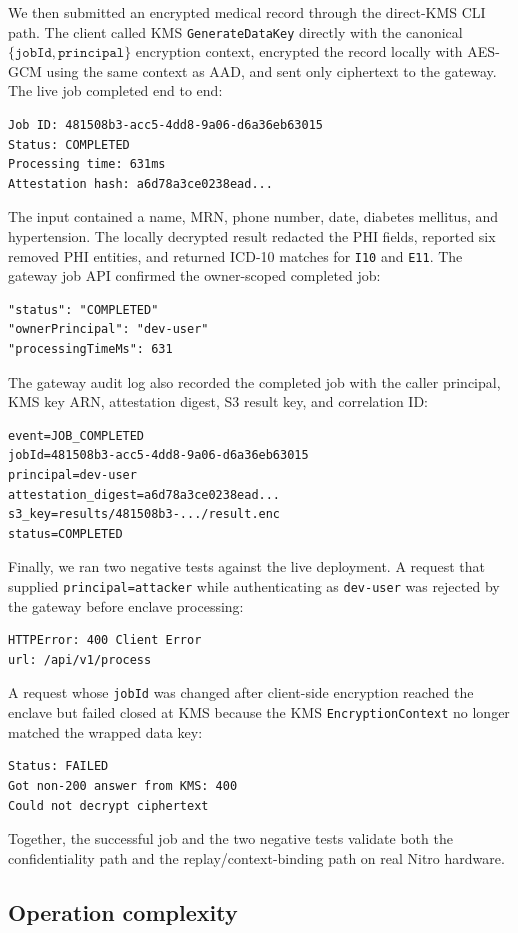 \documentclass[11pt]{article}
\begin{document}
We then submitted an encrypted medical record through the direct-KMS
CLI path. The client called KMS \texttt{GenerateDataKey} directly with
the canonical $\{\texttt{jobId},\texttt{principal}\}$ encryption
context, encrypted the record locally with AES-GCM using the same
context as AAD, and sent only ciphertext to the gateway. The live job
completed end to end:
\begin{verbatim}
Job ID: 481508b3-acc5-4dd8-9a06-d6a36eb63015
Status: COMPLETED
Processing time: 631ms
Attestation hash: a6d78a3ce0238ead...
\end{verbatim}
The input contained a name, MRN, phone number, date, diabetes mellitus,
and hypertension. The locally decrypted result redacted the PHI fields,
reported six removed PHI entities, and returned ICD-10 matches for
\texttt{I10} and \texttt{E11}. The gateway job API confirmed the
owner-scoped completed job:
\begin{verbatim}
"status": "COMPLETED"
"ownerPrincipal": "dev-user"
"processingTimeMs": 631
\end{verbatim}
The gateway audit log also recorded the completed job with the caller
principal, KMS key ARN, attestation digest, S3 result key, and
correlation ID:
\begin{verbatim}
event=JOB_COMPLETED
jobId=481508b3-acc5-4dd8-9a06-d6a36eb63015
principal=dev-user
attestation_digest=a6d78a3ce0238ead...
s3_key=results/481508b3-.../result.enc
status=COMPLETED
\end{verbatim}

Finally, we ran two negative tests against the live deployment. A
request that supplied \texttt{principal=attacker} while authenticating
as \texttt{dev-user} was rejected by the gateway before enclave
processing:
\begin{verbatim}
HTTPError: 400 Client Error
url: /api/v1/process
\end{verbatim}
A request whose \texttt{jobId} was changed after client-side
encryption reached the enclave but failed closed at KMS because the
KMS \texttt{EncryptionContext} no longer matched the wrapped data key:
\begin{verbatim}
Status: FAILED
Got non-200 answer from KMS: 400
Could not decrypt ciphertext
\end{verbatim}
Together, the successful job and the two negative tests validate both
the confidentiality path and the replay/context-binding path on real
Nitro hardware.

\subsection{Operation complexity}
\end{document}
